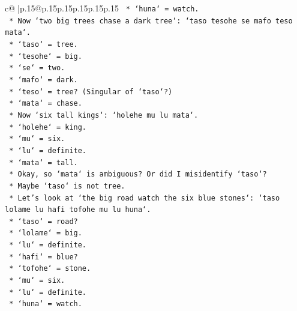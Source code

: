 \documentclass{article}
\begin{document}
{\begin{supertabular}{c@{$\;$}|p{.15\linewidth}@{}p{.15\linewidth}p{.15\linewidth}p{.15\linewidth}p{.15\linewidth}p{.15\linewidth}}
{{{\texttt{                            *   `huna` = watch.} \\
\texttt{                        *   Now `two big trees chase a dark tree`: `taso tesohe se mafo teso mata`.} \\
\texttt{                            *   `taso` = tree.} \\
\texttt{                            *   `tesohe` = big.} \\
\texttt{                            *   `se` = two.} \\
\texttt{                            *   `mafo` = dark.} \\
\texttt{                            *   `teso` = tree? (Singular of `taso`?)} \\
\texttt{                            *   `mata` = chase.} \\
\texttt{                        *   Now `six tall kings`: `holehe mu lu mata`.} \\
\texttt{                            *   `holehe` = king.} \\
\texttt{                            *   `mu` = six.} \\
\texttt{                            *   `lu` = definite.} \\
\texttt{                            *   `mata` = tall.} \\
\texttt{                        *   Okay, so `mata` is ambiguous? Or did I misidentify `taso`?} \\
\texttt{                        *   Maybe `taso` is not tree.} \\
\texttt{                        *   Let's look at `the big road watch the six blue stones`: `taso lolame lu hafi tofohe mu lu huna`.} \\
\texttt{                            *   `taso` = road?} \\
\texttt{                            *   `lolame` = big.} \\
\texttt{                            *   `lu` = definite.} \\
\texttt{                            *   `hafi` = blue?} \\
\texttt{                            *   `tofohe` = stone.} \\
\texttt{                            *   `mu` = six.} \\
\texttt{                            *   `lu` = definite.} \\
\texttt{                            *   `huna` = watch.} \\
}}}
\end{supertabular}}
\end{document}
